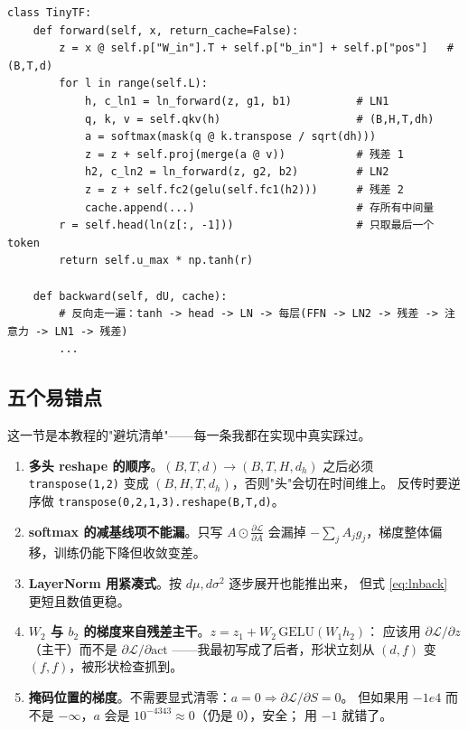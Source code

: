 \documentclass[11pt,a4paper]{ctexart}
\begin{document}
\begin{lstlisting}[caption={tinytf\_numpy.py 的核心结构}]
class TinyTF:
    def forward(self, x, return_cache=False):
        z = x @ self.p["W_in"].T + self.p["b_in"] + self.p["pos"]   # (B,T,d)
        for l in range(self.L):
            h, c_ln1 = ln_forward(z, g1, b1)          # LN1
            q, k, v = self.qkv(h)                     # (B,H,T,dh)
            a = softmax(mask(q @ k.transpose / sqrt(dh)))
            z = z + self.proj(merge(a @ v))           # 残差 1
            h2, c_ln2 = ln_forward(z, g2, b2)         # LN2
            z = z + self.fc2(gelu(self.fc1(h2)))      # 残差 2
            cache.append(...)                         # 存所有中间量
        r = self.head(ln(z[:, -1]))                   # 只取最后一个 token
        return self.u_max * np.tanh(r)

    def backward(self, dU, cache):
        # 反向走一遍：tanh -> head -> LN -> 每层(FFN -> LN2 -> 残差 -> 注意力 -> LN1 -> 残差)
        ...
\end{lstlisting}

\subsection{五个易错点}

这一节是本教程的"避坑清单"——每一条我都在实现中真实踩过。

\begin{enumerate}[leftmargin=1.6em,itemsep=4pt]
  \item \textbf{多头 reshape 的顺序}。$(B,T,d)\to(B,T,H,d_h)$ 之后必须
        \texttt{transpose(1,2)} 变成 $(B,H,T,d_h)$，否则"头"会切在时间维上。
        反传时要逆序做 \texttt{transpose(0,2,1,3).reshape(B,T,d)}。
  \item \textbf{softmax 的减基线项不能漏}。只写 $A\odot\frac{\partial\mathcal{L}}{\partial A}$
        会漏掉 $-\sum_jA_jg_j$，梯度整体偏移，训练仍能下降但收敛变差。
  \item \textbf{LayerNorm 用紧凑式}。按 $d\mu,d\sigma^2$ 逐步展开也能推出来，
        但式 \eqref{eq:lnback} 更短且数值更稳。
  \item \textbf{$W_2$ 与 $b_2$ 的梯度来自残差主干}。$z=z_1+W_2\,\mathrm{GELU}(W_1h_2)$：
        应该用 $\partial\mathcal{L}/\partial z$（主干）而不是 $\partial\mathcal{L}/\partial \mathrm{act}$
        ——我最初写成了后者，形状立刻从 $(d,f)$ 变 $(f,f)$，被形状检查抓到。
  \item \textbf{掩码位置的梯度}。不需要显式清零：$a=0\Rightarrow \partial\mathcal{L}/\partial S=0$。
        但如果用 $-1e4$ 而不是 $-\infty$，$a$ 会是 $10^{-4343}\approx0$（仍是 $0$），安全；
        用 $-1$ 就错了。
\end{enumerate}
\end{document}

